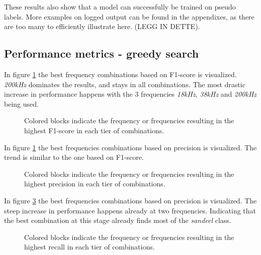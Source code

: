     
    These results also show that a model can successfully be trained on pseudo labels. More examples on logged output can be found in the appendixes, as there are too many to efficiently illustrate here. (LEGG IN DETTE). 
    
    \subsection{Performance metrics - greedy search}
        In figure \ref{increasing_freq_f1_score_fig} the best frequency combinations based on F1-score is visualized. \textit{200kHz} dominates the results, and stays in all combinations. The most drastic increase in performance happens with the 3 frequencies \textit{18kHz}, \textit{38kHz} and \textit{200kHz} being used.
        \begin{figure}[H]
            \centering
            
            \caption[Best frequency combination - F1-score]{Colored blocks indicate the frequency or frequencies resulting in the highest F1-score in each tier of combinations.}
          	\medskip 
            \label{increasing_freq_f1_score_fig}
        \end{figure}

        In figure \ref{increasing_freq_f1_score_fig} the best frequencies combinations based on precision is visualized. The trend is similar to the one based on F1-score.
        \begin{figure}[H]
            \centering
            
            \caption[Best frequency combination - Precision]{Colored blocks indicate the frequency or frequencies resulting in the highest precision in each tier of combinations.}
          	\medskip 
            \label{increasing_freq_precision_score_fig}
        \end{figure}
        
        In figure \ref{increasing_freq_recall_score_fig} the best frequencies combinations based on precision is visualized. The steep increase in performance happens already at two frequencies. Indicating that the best combination at this stage already finds most of the \textit{sandeel} class.
        \begin{figure}[H]
            \centering
            
            \caption[Best frequency combination - Recall]{Colored blocks indicate the frequency or frequencies resulting in the highest recall in each tier of combinations.}
          	\medskip 
            \label{increasing_freq_recall_score_fig}
        \end{figure}

